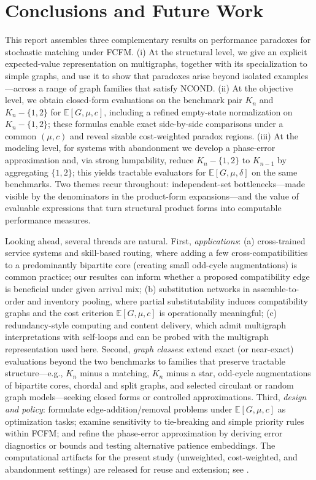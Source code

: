 \documentclass[11pt]{article}
\begin{document}
\section{Conclusions and Future Work}\label{sec:conclusions}

This report assembles three complementary results on performance paradoxes for stochastic matching under \textsc{FCFM}. (i) At the structural level, we give an explicit expected-value representation on multigraphs, together with its specialization to simple graphs, and use it to show that paradoxes arise beyond isolated examples—across a range of graph families that satisfy \textsc{NCOND}. (ii) At the objective level, we obtain closed-form evaluations on the benchmark pair $K_n$ and $K_n-\{1,2\}$ for $\mathbb{E}[G,\mu,c]$, including a refined empty-state normalization on $K_n-\{1,2\}$; these formulas enable exact side-by-side comparisons under a common $(\mu,c)$ and reveal sizable cost-weighted paradox regions. (iii) At the modeling level, for systems with abandonment we develop a phase-error approximation and, via strong lumpability, reduce $K_n-\{1,2\}$ to $K_{n-1}$ by aggregating $\{1,2\}$; this yields tractable evaluators for $\mathbb{E}[G,\mu,\delta]$ on the same benchmarks. Two themes recur throughout: independent-set bottlenecks—made visible by the denominators in the product-form expansions—and the value of evaluable expressions that turn structural product forms into computable performance measures.

Looking ahead, several threads are natural. First, \emph{applications}: (a) cross-trained service systems and skill-based routing, where adding a few cross-compatibilities to a predominantly bipartite core (creating small odd-cycle augmentations) is common practice; our resultes can inform whether a proposed compatibility edge is beneficial under given arrival mix; (b) substitution networks in assemble-to-order and inventory pooling, where partial substitutability induces compatibility graphs and the cost criterion $\mathbb{E}[G,\mu,c]$ is operationally meaningful; (c) redundancy-style computing and content delivery, which admit multigraph interpretations with self-loops and can be probed with the multigraph representation used here. Second, \emph{graph classes}: extend exact (or near-exact) evaluations beyond the two benchmarks to families that preserve tractable structure—e.g., $K_n$ minus a matching, $K_n$ minus a star, odd-cycle augmentations of bipartite cores, chordal and split graphs, and selected circulant or random graph models—seeking closed forms or controlled approximations. Third, \emph{design and policy}: formulate edge-addition/removal problems under $\mathbb{E}[G,\mu,c]$ as optimization tasks; examine sensitivity to tie-breaking and simple priority rules within \textsc{FCFM}; and refine the phase-error approximation by deriving error diagnostics or bounds and testing alternative patience embeddings. The computational artifacts for the present study (unweighted, cost-weighted, and abandonment settings) are released for reuse and extension; see \cite{li2025,li2025a,li2025b}.
\end{document}

